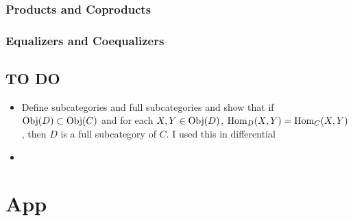 \documentclass{book}
\begin{document}
	
	
	
	
	
	
	
	
	
	
	
	
	
	
	
	
	
	
	\subsection{Products and Coproducts}
	
	
	
	
	
	
	
	
	
	
	
	
	
	
	
	\subsection{Equalizers and Coequalizers}
	
	

	\section{TO DO}
	\begin{itemize}
		\item Define subcategories and full subcategories and show that if $\operatorname{Obj}(D) \subset \operatorname{Obj}(C)$ and for each $X, Y \in \operatorname{Obj}(D)$, $\operatorname{Hom}_{D}(X, Y) = \operatorname{Hom}_{C}(X,Y)$, then $D$ is a full subcategory of $C$. I used this in differential 
		\item 
	\end{itemize}
	
	
	
	
	
	
	
	
	
	
	
	
	

	
	
	
	
	
	
	
	
	
	
	
	
	
	
	
	
	
	
	
	
	
	
	
	
	\appendix
	\chapter{App}
	
	
	
	
	
	
	
	\backmatter
	
	
	
	
	
	
	
	
	
	
	
	
	
	
\end{document}
